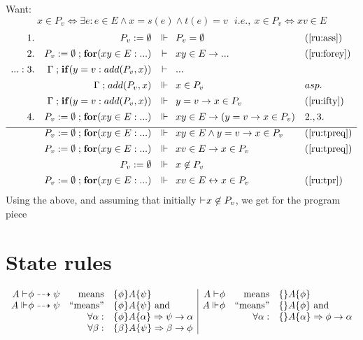 Want:
\[
x\in P_v \iff \exists e: e\in E\land x=s(e) \land t(e)=v \ \ \  i.e.,\ x\in P_v
\iff xv\in E
\]
\[
\begin{array}{rrcll}
1.& P_v:=\emptyset & \tpr & P_v=\emptyset & (\ref{ru:ass}) \\[1ex]
2.& P_v:=\emptyset \se \fore{xy\in E}{...} & \pr & xy\in E\impl ... & (\ref{ru:forey})\\[1ex]
...:3.& \Gamma \se {\ift{y=v}{add(P_v,x)}} & \pr & ... \\[1ex]
    & \Gamma \se add(P_v,x) & \tpr &  x\in P_v & asp. \\[1ex]
 & \Gamma \se {\ift{y=v}{add(P_v,x)}} & \tpr & y=v\impl x\in P_v & (\ref{ru:ifty})\\[1ex]
4.& P_v:=\emptyset \se \fore{xy\in E}{...} & \tpr & xy\in E\impl
(y=v\impl x\in P_v) & 2.,3. \\[1ex]\hline
& P_v:=\emptyset \se \fore{xy\in E}{...} & \tpr & xy\in E\land
y=v\impl x\in P_v & (\ref{ru:tpreq}) \\[1ex]
& P_v:=\emptyset \se \fore{xy\in E}{...} & \tpr & xv\in E \impl x\in P_v &
 (\ref{ru:tpreq}) \\[1ex]
& P_v:=\emptyset & \tpr & x\not\in P_v \\[1ex]
& P_v:=\emptyset \se \fore{xy\in E}{...} & \tpr & xv\in E \ii x\in P_v &
(\ref{ru:tpr}) 
\end{array}
\]
Using the above, and assuming that initially $\mathrel{\vdash_{\!\!{\scriptscriptstyle \cal }}} x\not\in P_v$, we get for the program piece

\newpage
\section*{State rules}
\[\begin{array}{rrl|rrl}
A\pr\phi\timpl\psi &  {\rm means} & \{\phi\}A\{\psi\}   
   &  A\pr\phi &  {\rm means} & \{\}A\{\phi\} \\
A\tpr\phi\timpl\psi &  \mbox{\rm ``means''} & \{\phi\}A\{\psi\}\  {\rm and}   
   &  A\tpr\phi &  \mbox{\rm ``means''} & \{\}A\{\phi\}\  {\rm and} \\
&  \forall\alpha: & \{\phi\}A\{\alpha\}\Impl \psi\impl\alpha  
   & & \forall\alpha: & \{\}A\{\alpha\}\Impl \phi\impl\alpha \\
& \forall\beta: & \{\beta\}A\{\psi\}\Impl \beta\impl\phi
\end{array}
\]
